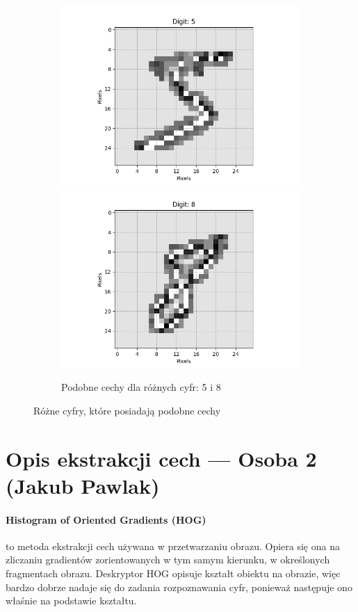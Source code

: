 \documentclass[10pt]{article}
\begin{document}
\begin{figure}[H]
\begin{subfigure}[t]{.2\textwidth}
        \includegraphics[width=\linewidth]{img/LBP/LBP_5}
        \includegraphics[width=\linewidth]{img/LBP/LBP_8}
        \caption{Podobne cechy dla różnych cyfr: 5 i 8}
    \end{subfigure}
    \caption{Różne cyfry, które posiadają podobne cechy}\label{fig:lbp-similar}
\end{figure}

\pagebreak

\section{Opis ekstrakcji cech --- Osoba 2 (Jakub Pawlak)}

\paragraph{Histogram of Oriented Gradients (HOG)} to metoda ekstrakcji cech używana w przetwarzaniu obrazu.
Opiera się ona na zliczaniu gradientów zorientowanych w tym samym kierunku, w określonych fragmentach obrazu.
Deskryptor HOG opisuje kształt obiektu na obrazie, więc bardzo dobrze nadaje się do zadania rozpoznawania cyfr, ponieważ następuje ono właśnie na podstawie kształtu.
\end{document}
